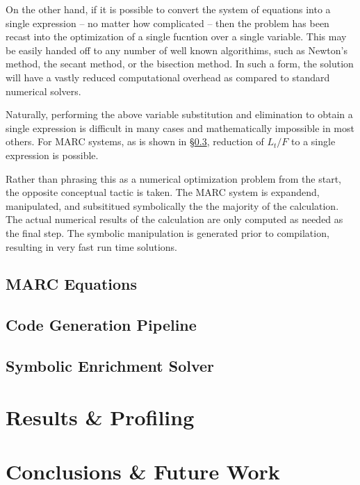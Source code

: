 \documentclass[preprint,12pt]{elsarticle}
\begin{document}
On the other hand, if it is possible to convert the system of equations 
into a single expression -- no matter how complicated -- then the problem has been 
recast into the optimization of a single fucntion over a single variable.   This 
may be easily handed off to any number of well known algorithims, such as Newton's
method, the secant method, or the bisection method.  In such a form, the solution 
will have a vastly reduced computational overhead as compared to standard 
numerical solvers. 

Naturally, performing the above variable substitution and elimination to obtain a 
single expression is difficult in many cases and mathematically impossible in most 
others.  For MARC systems, as is shown in \S \ref{sec:symes}, reduction of $L_t/F$
to a single expression is possible.

Rather than phrasing this as a numerical optimization problem from the start, the 
opposite conceptual tactic is taken.  The MARC system is expandend, manipulated, 
and subsititued symbolically the the majority of the calculation.  The actual 
numerical results of the calculation are only computed as needed as the final step.
The symbolic manipulation is generated prior to compilation, resulting in 
very fast run time solutions.

\subsection{MARC Equations}
\label{sec:marceq}

\subsection{Code Generation Pipeline}
\label{sec:codegen}

\subsection{Symbolic Enrichment Solver}
\label{sec:symes}

\section{Results \& Profiling}
\label{sec:res}

\section{Conclusions \& Future Work}
\label{sec:conc}


\end{document}
